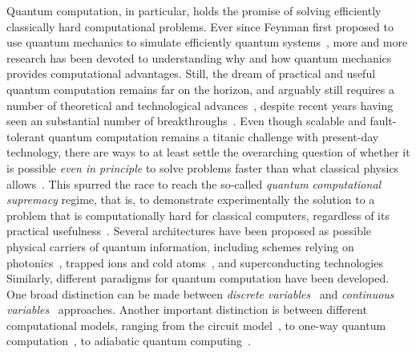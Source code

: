 Quantum computation, in particular, holds the promise of solving efficiently classically hard computational problems.
Ever since Feynman first proposed to use quantum mechanics to simulate efficiently quantum systems~\cite{feynman1982simulating}, more and more research has been devoted to understanding why and how quantum mechanics provides computational advantages.
Still, the dream of practical and useful quantum computation remains far on the horizon, and arguably still requires a number of theoretical and technological advances~\cite{dowling2003quantum,preskill2018quantum},
despite recent years having seen an substantial number of breakthroughs~\cite{fowler2012surface,barends2014superconducting,córcoles2015demonstration,ofek2016extending,arute2019quantum}.
Even though scalable and fault-tolerant quantum computation remains a titanic challenge with present-day technology, there are ways to at least settle the overarching question of whether it is possible \textit{even in principle} to solve problems faster than what classical physics allows~\cite{aaronson2011computational,bremner2016average,boixo2018characterizing,aaronson2017complexity,neill2018blueprint}. This spurred the race to reach the so-called \textit{quantum computational supremacy} regime, that is, to demonstrate experimentally the solution to a problem that is computationally hard for classical computers, regardless of its practical usefulness~\cite{broome2012photonic,spring2012boson,crespi2013integrated,tillmann2013experimental,bentivegna2015experimental,zhong201812photon,zhong2019experimental,wang2019boson,bouland2018complexity,arute2019quantum}.
Several architectures have been proposed as possible physical carriers of quantum information, including schemes relying on photonics~\cite{flamini2018photonic,wang2019integrated}, trapped ions and cold atoms~\cite{garcía-ripoll2005quantum,lekitsch2017blueprint,bruzewicz2019trappedion}, and superconducting technologies~\cite{you2011atomic,krantz2019quantum}
Similarly, different paradigms for quantum computation have been developed. One broad distinction can be made between \textit{discrete variables}~\cite{walmsley2005applied,andersen2015hybrid} and \textit{continuous variables}~\cite{lloyd1999quantum,braunstein2005quantum} approaches.
Another important distinction is between different computational models, ranging from the circuit model~\cite{nielsen2006quantum}, to one-way quantum computation~\cite{raussendorf2001one,walther2005experimental,browne2006one}, to adiabatic quantum computing~\cite{aharonov2004adiabatic,albash2018adiabatic}.

